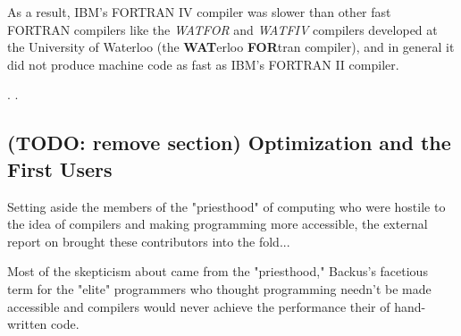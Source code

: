 As a result, IBM's FORTRAN IV compiler was slower than other fast FORTRAN compilers
like the \textit{WATFOR} and \textit{WATFIV} compilers developed at the University of Waterloo
(the \textbf{WAT}erloo \textbf{FOR}tran compiler\cite{cress_dirksen_graham_watfor_fortran_iv_1970}),
and in general it did not produce machine code as fast as IBM's FORTRAN II compiler.


.
\cite{backus_heising_fortran_1964}.


\subsection{(TODO: remove section) Optimization and the First Users}

Setting aside the members of the "priesthood" of computing who were hostile to
the idea of compilers and making programming more accessible, the external
report on \FTN{} brought these contributors into the fold...

Most of the skepticism about \FTN{} came from the "priesthood," Backus's
facetious term for the "elite" programmers who thought programming needn't be
made accessible and compilers would never achieve the performance their of
hand-written code.

